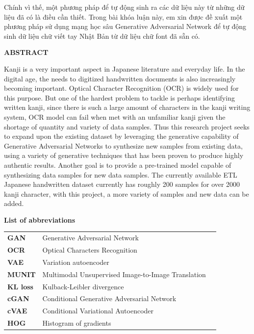 \documentclass[12pt]{report}
\begin{document}
Chính vì thế, một phương pháp để tự động sinh ra các dữ liệu này từ những dữ liệu đã có là điều cần thiết. Trong bài khóa luận này, em xin được đề xuất một phương pháp sử dụng mạng học sâu Generative Adversarial Network để tự động sinh dữ liệu chữ viết tay Nhật Bản từ dữ liệu chữ font đã sẵn có.

\newpage
\begin{center}
	\textbf{\large ABSTRACT}
\end{center}
Kanji is a very important aspect in Japanese literature and everyday life. In the digital age, the needs to digitized handwritten documents is also increasingly becoming important. Optical Character Recognition (OCR) is widely used for this purpose. But one of the hardest problem to tackle is perhaps identifying written kanji, since there is such a large amount of characters in the kanji writing system, OCR model can fail when met with an unfamiliar kanji given the shortage of quantity and variety of data samples. Thus this research project seeks to expand upon the existing dataset by leveraging the generative capability of Generative Adversarial Networks to synthesize new samples from existing data, using a variety of generative techniques that has been proven to produce highly authentic results. Another goal is to provide a pre-trained model capable of synthesizing data samples for new data samples.
The currently available ETL Japanese handwritten dataset \cite{etl} currently has roughly 200 samples for over 2000 kanji character, with this project, a more variety of samples and new data can be added.

\newpage
\tableofcontents

\newpage
{}
\listoftables

\newpage
{}
\begin{flushleft}
\bfseries{\Huge{List of abbreviations}}
\end{flushleft}
\begin{table}[h]
	\centering
	\begin{tabular}{lll}
		\textbf{GAN}  & Generative Adversarial Network\\[0.3cm]
		\textbf{OCR}  & Optical Characters Recognition              \\[0.3cm]
		\textbf{VAE} & Variation autoencoder \\[0.3cm]
		\textbf{MUNIT} & Multimodal Unsupervised Image-to-Image Translation \\[0.3cm]	
		\textbf{KL loss} & Kulback-Leibler divergence \\[0.3cm]
		\textbf{cGAN} & Conditional Generative Adversarial Network \\[0.3cm]
		\textbf{cVAE} & Conditional Variational Autoencoder \\[0.3cm]
		\textbf{HOG} & Histogram of gradients \\[0.3cm]
	\end{tabular}
\end{table}
\end{document}
